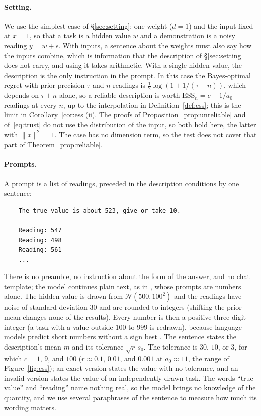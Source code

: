 \documentclass[10pt]{article}
\newcommand{\ess}{\mathrm{ESS}}
\begin{document}
\paragraph{Setting.} We use the simplest case of \S\ref{sec:setting}: one weight ($d = 1$) and the input fixed at $x = 1$, so that a task is a hidden value $w$ and a demonstration is a noisy reading $y = w + \epsilon$. With inputs, a sentence about the weights must also say how the inputs combine, which is information that the description of \S\ref{sec:setting} does not carry, and using it takes arithmetic. With a single hidden value, the description is the only instruction in the prompt. In this case the Bayes-optimal regret with prior precision $\tau$ and $n$ readings is $\tfrac12 \log(1 + 1/(\tau + n))$, which depends on $\tau + n$ alone, so a reliable description is worth $\ess_n = c - 1/a_0$ readings at every $n$, up to the interpolation in Definition~\ref{def:ess}; this is the limit in Corollary~\ref{cor:ess}(ii). The proofs of Proposition~\ref{prop:unreliable} and of~\eqref{eq:trust} do not use the distribution of the input, so both hold here, the latter with $\|x\|^2 = 1$. The case has no dimension term, so the test does not cover that part of Theorem~\ref{prop:reliable}.

\paragraph{Prompts.} A prompt is a list of readings, preceded in the description conditions by one sentence:

\smallskip\noindent\begin{minipage}{\linewidth}
\begin{verbatim}
    The true value is about 523, give or take 10.

    Reading: 547
    Reading: 498
    Reading: 561
    ...
\end{verbatim}
\end{minipage}
\smallskip

\noindent There is no preamble, no instruction about the form of the answer, and no chat template; the model continues plain text, as in \citet{liu2025}, whose prompts are numbers alone. The hidden value is drawn from $\mathcal{N}(500, 100^2)$ and the readings have noise of standard deviation $30$ and are rounded to integers (shifting the prior mean changes none of the results). Every number is then a positive three-digit integer (a task with a value outside $100$ to $999$ is redrawn), because language models predict short numbers without a sign best \citep{gruver2023, requeima2024}. The sentence states the description's mean $m$ and its tolerance $\sqrt{r}\,s_0$. The tolerance is $30$, $10$, or $3$, for which $c = 1$, $9$, and $100$ ($r \approx 0.1$, $0.01$, and $0.001$ at $a_0 \approx 11$, the range of Figure~\ref{fig:ess}); an exact version states the value with no tolerance, and an invalid version states the value of an independently drawn task. The words ``true value'' and ``reading'' name nothing real, so the model brings no knowledge of the quantity, and we use several paraphrases of the sentence to measure how much its wording matters.
\end{document}
